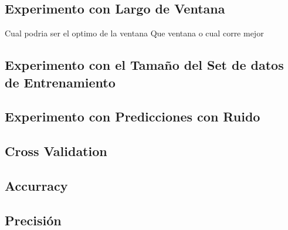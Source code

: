 













\subsection{Experimento con Largo de Ventana}

	Cual podria ser el optimo de la ventana
	Que ventana o cual corre mejor



\subsection{Experimento con el Tamaño del Set de datos de Entrenamiento}


\subsection{Experimento con Predicciones con Ruido}




\subsection{Cross Validation}


\subsection{Accurracy}



\subsection{Precisión}


	
